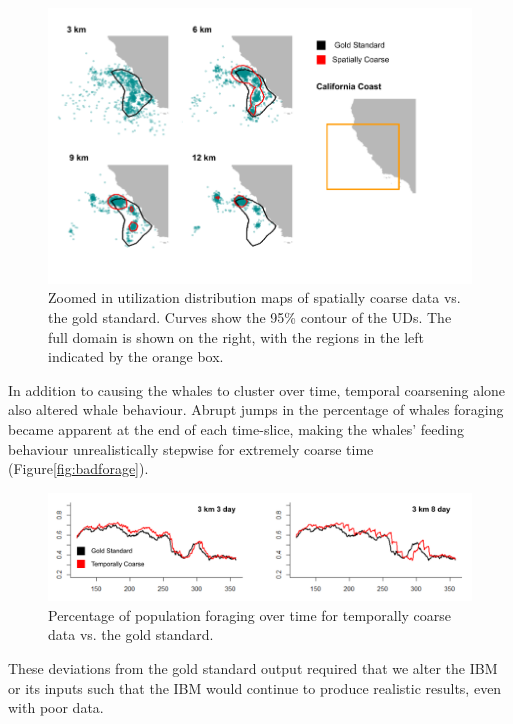 \documentclass[11pt]{article}
\begin{document}
\begin{figure}[ht] \centering
    \includegraphics[width=6in]{spatial_coarsening.png}
    \caption{Zoomed in utilization distribution maps of spatially coarse data vs. the gold standard. Curves show the 95\% contour of the UDs. The full domain is shown on the right, with the regions in the left indicated by the orange box.}
    \label{fig:udfix}
\end{figure}

In addition to causing the whales to cluster over time, temporal coarsening alone also altered whale behaviour. Abrupt jumps in the percentage of whales foraging became apparent at the end of each time-slice, making the whales' feeding behaviour unrealistically stepwise for extremely coarse time (Figure\ref{fig:badforage}).\par 

\begin{figure}[ht] \centering
    \includegraphics[width=6in]{temporal_coarsening.png}
    \caption{Percentage of population foraging over time for temporally coarse data vs. the gold standard.}
\end{figure}

These deviations from the gold standard output required that we alter the IBM or its inputs such that the IBM would continue to produce realistic results, even with poor data. \par
\end{document}
